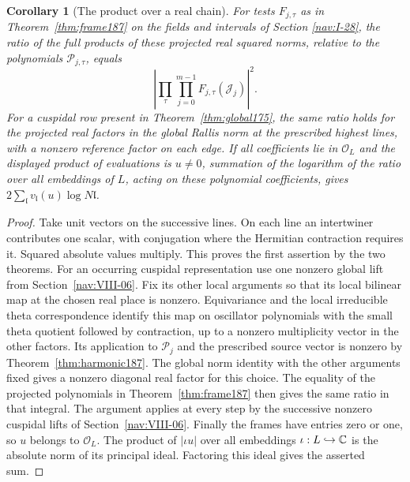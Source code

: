 \documentclass[a4paper,11pt]{article}
\newtheorem{corollary}[proposition]{Corollary}
\theoremstyle{definition}
\theoremstyle{remark}
\numberwithin{equation}{section}
\begin{document}
\begin{corollary}[The product over a real chain]
\label{cor:product187}
For tests \(F_{j,\tau}\) as in Theorem~\ref{thm:frame187} on
the fields and intervals of Section \ref{nav:I-28}, the ratio
of the full products of these projected real squared norms,
relative to the polynomials \(\mathcal P_{j,\tau}\), equals
\[
          \left|\prod_{\tau}\prod_{j=0}^{m-1}
                         F_{j,\tau}(\mathcal J_j)\right|^2 .
\]
For a cuspidal row present in Theorem~\ref{thm:global175}, the
same ratio holds for the projected real factors in the global
Rallis norm at the prescribed highest lines, with a nonzero
reference factor on each edge. If all coefficients lie in
\(\mathcal O_L\) and the displayed product of evaluations is
\(u\ne0\), summation of the logarithm of the ratio over all
embeddings of \(L\), acting on these polynomial coefficients,
gives \(2\sum_{\mathfrak l} v_{\mathfrak l}(u)\log N\mathfrak l\).
\end{corollary}
\begin{proof}
Take unit vectors on the successive lines. On each line an
intertwiner contributes one scalar, with conjugation where the
Hermitian contraction requires it. Squared absolute values
multiply. This proves the first assertion by the two theorems.
For an occurring cuspidal representation use one nonzero global
lift from Section~\ref{nav:VIII-06}. Fix its other local arguments so that
its local bilinear map at the chosen real place is nonzero.
Equivariance and the local irreducible theta correspondence
identify this map on oscillator polynomials with the small
theta quotient followed by contraction, up to a nonzero
multiplicity vector in the other factors. Its application to
\(\mathcal P_j\) and the prescribed source vector is nonzero by
Theorem~\ref{thm:harmonic187}. The global norm identity with
the other arguments fixed gives a nonzero diagonal real
factor for this choice. The equality of the projected
polynomials in Theorem~\ref{thm:frame187} then gives the same
ratio in that integral. The argument applies at every step
by the successive nonzero cuspidal lifts of Section~\ref{nav:VIII-06}.
Finally the frames have entries zero or one, so \(u\) belongs
to \(\mathcal O_L\). The product of \(|\iota u|\) over all
embeddings \(\iota:L\hookrightarrow\mathbb C\) is the absolute
norm of its principal ideal. Factoring this ideal gives the
asserted sum.
\end{proof}
\end{document}
